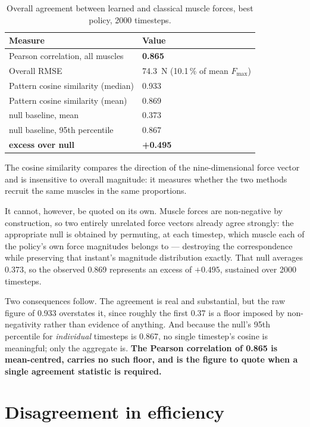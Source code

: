 \begin{table}[H]
\centering
\caption{Overall agreement between learned and classical muscle forces, best
policy, 2000 timesteps.}
\begin{tabular}{@{} L{8.2cm} R{4.0cm} @{}}
\toprule
\textbf{Measure} & \textbf{Value} \\
\midrule
Pearson correlation, all muscles & \textbf{0.865} \\
Overall RMSE & \SI{74.3}{\newton} (10.1\,\% of mean $F_{\max}$) \\
\midrule
Pattern cosine similarity (median) & 0.933 \\
Pattern cosine similarity (mean) & 0.869 \\
\quad null baseline, mean & 0.373 \\
\quad null baseline, 95th percentile & 0.867 \\
\quad \textbf{excess over null} & \textbf{+0.495} \\
\bottomrule
\end{tabular}
\label{tab:forceoverall}
\end{table}

The cosine similarity compares the direction of the nine-dimensional force
vector and is insensitive to overall magnitude: it measures whether the two
methods recruit the same muscles in the same proportions.

It cannot, however, be quoted on its own. Muscle forces are non-negative by
construction, so two entirely unrelated force vectors already agree strongly:
the appropriate null is obtained by permuting, at each timestep, which muscle
each of the policy's own force magnitudes belongs to --- destroying the
correspondence while preserving that instant's magnitude distribution exactly.
That null averages 0.373, so the observed 0.869 represents an excess of
$+0.495$, sustained over 2000 timesteps.

Two consequences follow. The agreement is real and substantial, but the raw
figure of 0.933 overstates it, since roughly the first 0.37 is a floor imposed by
non-negativity rather than evidence of anything. And because the null's 95th
percentile for \emph{individual} timesteps is 0.867, no single timestep's cosine
is meaningful; only the aggregate is. \textbf{The Pearson correlation of 0.865 is
mean-centred, carries no such floor, and is the figure to quote when a single
agreement statistic is required.}

\section{Disagreement in efficiency}

